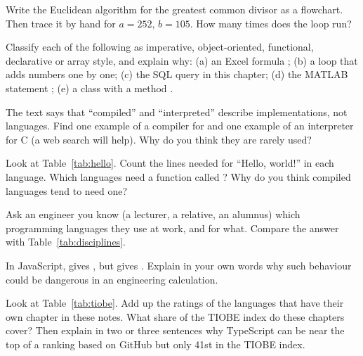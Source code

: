 \begin{exercises}
\item Write the Euclidean algorithm for the greatest common divisor as a flowchart. Then
  trace it by hand for $a = 252$, $b = 105$. How many times does the loop run?
\item Classify each of the following as imperative, object-oriented, functional,
  declarative or array style, and explain why: (a) an Excel formula
  ; (b) a \py loop that adds numbers one by one; (c) the SQL query in
  this chapter; (d) the MATLAB statement ; (e) a \py class
   with a method .
\item The text says that ``compiled'' and ``interpreted'' describe implementations, not
  languages. Find one example of a compiler for \py and one example of an interpreter for C
  (a web search will help). Why do you think they are rarely used?
\item Look at Table~\ref{tab:hello}. Count the lines needed for ``Hello, world!'' in each
  language. Which languages need a function called ? Why do you think compiled
  languages tend to need one?
\item Ask an engineer you know (a lecturer, a relative, an alumnus) which programming
  languages they use at work, and for what. Compare the answer with
  Table~\ref{tab:disciplines}.
\item In JavaScript,  gives , but  gives .
  Explain in your own words why such behaviour could be dangerous in an engineering
  calculation.
\item Look at Table~\ref{tab:tiobe}. Add up the ratings of the languages that have their
  own chapter in these notes. What share of the TIOBE index do these chapters cover? Then
  explain in two or three sentences why TypeScript can be near the top of a ranking based on
  GitHub but only 41st in the TIOBE index.
\end{exercises}
